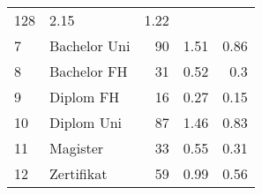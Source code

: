 \begin{longtable}{lXrrr}
       \num{128} &
       \num[round-mode=places,round-precision=2]{2,15} &
         \num[round-mode=places,round-precision=2]{1,22} \\

     7 &
     \multicolumn{1}{X}{ Bachelor Uni   } &


       \num{90} &
       \num[round-mode=places,round-precision=2]{1,51} &
         \num[round-mode=places,round-precision=2]{0,86} \\

     8 &
     \multicolumn{1}{X}{ Bachelor FH   } &


       \num{31} &
       \num[round-mode=places,round-precision=2]{0,52} &
         \num[round-mode=places,round-precision=2]{0,3} \\

     9 &
     \multicolumn{1}{X}{ Diplom FH   } &


       \num{16} &
       \num[round-mode=places,round-precision=2]{0,27} &
         \num[round-mode=places,round-precision=2]{0,15} \\

     10 &
     \multicolumn{1}{X}{ Diplom Uni   } &


       \num{87} &
       \num[round-mode=places,round-precision=2]{1,46} &
         \num[round-mode=places,round-precision=2]{0,83} \\

     11 &
     \multicolumn{1}{X}{ Magister   } &


       \num{33} &
       \num[round-mode=places,round-precision=2]{0,55} &
         \num[round-mode=places,round-precision=2]{0,31} \\

     12 &
     \multicolumn{1}{X}{ Zertifikat   } &


       \num{59} &
       \num[round-mode=places,round-precision=2]{0,99} &
         \num[round-mode=places,round-precision=2]{0,56} \\


\end{longtable}
